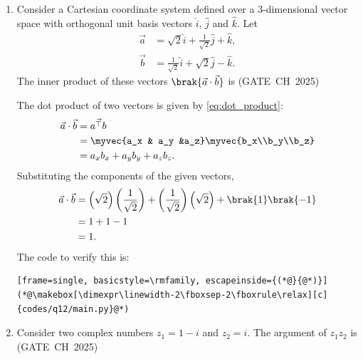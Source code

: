 \begin{enumerate}[label=\thesubsection.\arabic*, ref=\thesubsection.\theenumi,itemsep=0pt]

\item Consider a Cartesian coordinate system defined over a 3-dimensional vector space with orthogonal unit basis vectors $\hat{i}$, $\hat{j}$ and $\hat{k}$. Let
\begin{align}
\vec{a} &= \sqrt{2}\hat{i}+\frac{1}{\sqrt{2}}\hat{j}+\hat{k},\\
\vec{b} &= \frac{1}{\sqrt{2}}\hat{i}+\sqrt{2}\hat{j}-\hat{k}.
\end{align}
The inner product of these vectors $\brak{\vec{a}\cdot\vec{b}}$ is \hfill (GATE~CH~2025)
\begin{enumerate}[itemsep=0pt]
\end{enumerate}

\solution The dot product of two vectors is given by \eqref{eq:dot_product}:
\begin{align}
\vec{a}\cdot\vec{b} &= \vec{a^{\top}b}\\
&= \myvec{a_x & a_y &a_z}\myvec{b_x\\b_y\\b_z}\\
&= a_xb_x+a_yb_y+a_zb_z.
\end{align}
Substituting the components of the given vectors,
\begin{align}
\vec{a}\cdot\vec{b}
&=\left(\sqrt{2}\right)\left(\frac{1}{\sqrt{2}}\right)
+\left(\frac{1}{\sqrt{2}}\right)\left(\sqrt{2}\right)
+\brak{1}\brak{-1}\\
&=1+1-1\\
&=1.
\end{align}
The code to verify this is:
\begin{lstlisting}[frame=single, basicstyle=\rmfamily, escapeinside={(*@}{@*)}]
(*@\makebox[\dimexpr\linewidth-2\fboxsep-2\fboxrule\relax][c]{codes/q12/main.py}@*)
\end{lstlisting}

\item Consider two complex numbers $z_1=1-i$ and $z_2=i$. The argument of $z_1z_2$ is \hfill (GATE~CH~2025)
\begin{enumerate}[itemsep=0pt]
\end{enumerate}


\end{enumerate}
